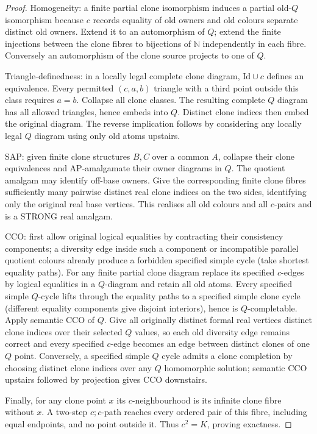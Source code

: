 \begin{proof}
Homogeneity: a finite partial clone isomorphism induces a partial
old-$Q$ isomorphism because $c$ records equality of old owners and old
colours separate distinct old owners. Extend it to an automorphism of $Q$;
extend the finite injections between the clone fibres to bijections of
$\mathbb N$ independently in each fibre. Conversely an automorphism of the
clone source projects to one of $Q$.

Triangle-definedness: in a locally legal complete clone diagram,
$\mathrm{Id}\cup c$ defines an equivalence. Every permitted
$(c,a,b)$ triangle with a third point outside this class requires $a=b$.
Collapse all clone classes. The resulting complete $Q$ diagram has all
allowed triangles, hence embeds into $Q$. Distinct clone indices then
embed the original diagram. The reverse implication follows by considering
any locally legal $Q$ diagram using only old atoms upstairs.

SAP: given finite clone structures $B,C$ over a common $A$, collapse their
clone equivalences and AP-amalgamate their owner diagrams in $Q$.
The quotient amalgam may identify off-base owners. Give the corresponding
finite clone fibres sufficiently many pairwise distinct real clone indices
on the two sides, identifying only the original real base vertices. This
realises all old colours and all $c$-pairs and is a STRONG real amalgam.

CCO: first allow original logical equalities by contracting their
consistency components; a diversity edge inside such a component or
incompatible parallel quotient colours already produce a forbidden
specified simple cycle (take shortest equality paths). For any finite
partial clone diagram replace its specified $c$-edges by logical
equalities in a $Q$-diagram and retain all old atoms. Every specified
simple $Q$-cycle lifts through the equality paths to a specified simple
clone cycle (different equality components give disjoint interiors), hence
is $Q$-completable. Apply semantic CCO of $Q$. Give all originally distinct
formal real vertices distinct clone indices over their selected $Q$ values,
so each old diversity edge remains correct and every specified $c$-edge
becomes an edge between distinct clones of one $Q$ point.
Conversely, a specified simple $Q$ cycle admits a clone completion by
choosing distinct clone indices over any $Q$ homomorphic solution;
semantic CCO upstairs followed by projection gives CCO downstairs.

Finally, for any clone point $x$ its $c$-neighbourhood is its infinite
clone fibre without $x$. A two-step $c;c$-path reaches every ordered pair
of this fibre, including equal endpoints, and no point outside it.
Thus $c^2=K$, proving exactness.\end{proof}
